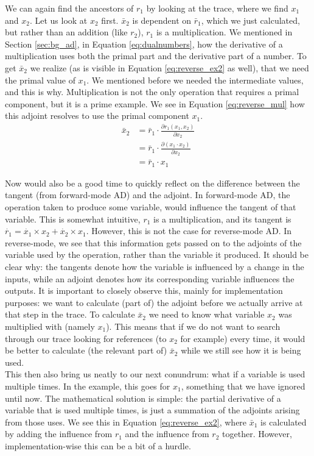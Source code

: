     We can again find the ancestors of $r_1$ by looking at the trace, where we find $x_1$ and $x_2$.
    Let us look at $x_2$ first.
    $\bar{x}_2$ is dependent on $\bar{r}_1$, which we just calculated, but rather than an addition (like $r_2$), $r_1$ is a multiplication.
    We mentioned in Section \ref{sec:bg_ad}, in Equation \ref{eq:dualnumbers}, how the derivative of a multiplication uses both the primal part and the derivative part of a number.
    To get $\bar{x}_2$ we realize (as is visible in Equation \ref{eq:reverse_ex2} as well), that we need the primal value of $x_1$.
    We mentioned before we needed the intermediate values, and this is why.
    Multiplication is not the only operation that requires a primal component, but it is a prime example.
    We see in Equation \ref{eq:reverse_mul} how this adjoint resolves to use the primal component $x_1$.
    \begin{equation} \label{eq:reverse_mul}
        \begin{aligned}
            \bar{x}_2&=\bar{r}_1\cdot\frac{\partial r_1(x_1,x_2)}{\partial x_2}\\
            &=\bar{r}_1\cdot\frac{\partial(x_1\cdot x_2)}{\partial x_2}\\
            &=\bar{r}_1\cdot x_1
        \end{aligned}
    \end{equation}

    Now would also be a good time to quickly reflect on the difference between the tangent (from forward-mode AD) and the adjoint.
    In forward-mode AD, the operation taken to produce some variable, would influence the tangent of that variable.
    This is somewhat intuitive, $r_1$ is a multiplication, and its tangent is $\dot{r_1}=\dot{x_1}\times x_2+\dot{x_2}\times x_1$.
    However, this is not the case for reverse-mode AD.
    In reverse-mode, we see that this information gets passed on to the adjoints of the variable used by the operation, rather than the variable it produced.
    It should be clear why: the tangents denote how the variable is influenced by a change in the inputs, while an adjoint denotes how its corresponding variable influences the outputs.
    It is important to closely observe this, mainly for implementation purposes: we want to calculate (part of) the adjoint before we actually arrive at that step in the trace.
    To calculate $\bar{x}_2$ we need to know what variable $x_2$ was multiplied with (namely $x_1$).
    This means that if we do not want to search through our trace looking for references (to $x_2$ for example) every time, it would be better to calculate (the relevant part of) $\bar{x}_2$ while we still see how it is being used.\\
    This then also bring us neatly to our next conundrum: what if a variable is used multiple times.
    In the example, this goes for $x_1$, something that we have ignored until now.
    The mathematical solution is simple: the partial derivative of a variable that is used multiple times, is just a summation of the adjoints arising from those uses.
    We see this in Equation \ref{eq:reverse_ex2}, where $\bar{x}_1$ is calculated by adding the influence from $r_1$ and the influence from $r_2$ together.
    However, implementation-wise this can be a bit of a hurdle.


